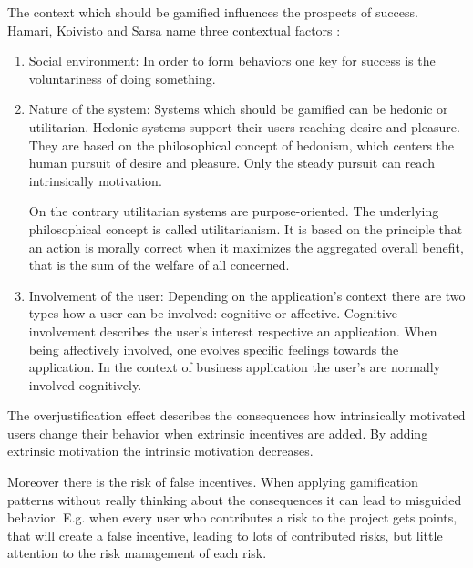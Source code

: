 The context which should be gamified influences the prospects of success.  Hamari, Koivisto and Sarsa name three contextual factors \cite[p. 3029, 3030]{hamariDoesGamificationWork2014}:
\begin{enumerate}
	\item Social environment: \newline
	In order to form behaviors  one key for success is the voluntariness of doing something. \cite[p. 3030]{hamariDoesGamificationWork2014}
		
	\item Nature of the system: \newline
	Systems which should be gamified can be hedonic or utilitarian. Hedonic systems support their users reaching desire and pleasure. \cite[p. 3030]{hamariDoesGamificationWork2014}
	They are based on the philosophical concept of hedonism, which centers the human pursuit of desire and pleasure. Only the steady pursuit can reach intrinsically motivation. \cite[p. LV ]{mueller-saloHenrySidgwickUtilitarismus2019}
		
	On the contrary utilitarian systems are purpose-oriented. The underlying philosophical concept is called utilitarianism. It is based on the principle that an action is morally correct when it maximizes the aggregated overall benefit, that is the sum of the welfare of all concerned. \cite[p. 3 ]{mueller-saloHenrySidgwickUtilitarismus2019}
		
	\item Involvement of the user: \newline
	Depending on the application's context there are two types how a user can be involved: cognitive or affective. \cite[p. 3030]{hamariDoesGamificationWork2014} Cognitive involvement describes the user's interest respective an application. When being affectively involved, one evolves specific feelings towards the application. In the context of business application the user's are normally involved cognitively. \cite{zaichkowskyPersonalInvolvementInventory2013}
\end{enumerate}

The overjustification effect describes the consequences how intrinsically motivated users change their behavior when extrinsic incentives are added. By adding extrinsic motivation the intrinsic motivation decreases. \cite[p. 9-13]{bierhoffeditorEnzyklopaediePsychologieSoziale2016}
	
Moreover there is the risk of false incentives. When applying gamification patterns without really thinking about the consequences it can lead to misguided behavior. E.g. when every user who contributes a risk to the project gets points, that will create a false incentive, leading to lots of contributed risks, but little attention to the risk management of each risk. \cite[p.69]{kumarGamificationWorkDesigning2013}
 
